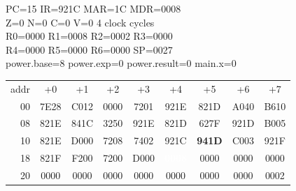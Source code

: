 \begin{tcolorbox}[stepbox, title={Step 5 \hfill PC 14 \quad ST R1, power.base}]
PC=15 IR=921C MAR=1C MDR=0008\\
Z=0 N=0 C=0 V=0 \hfill \textcolor{dim}{4 clock cycles}\\
R0=0000 R1=0008 R2=0002 R3=0000\\
R4=0000 R5=0000 R6=0000 SP=0027\\
\textcolor{dim}{power.base=8  power.exp=0  power.result=0  main.x=0}\\[1pt]
{\setlength{\tabcolsep}{1.6pt}\begin{tabular}{@{}r*{8}{c}@{}}
\textcolor{dim}{addr} & \textcolor{dim}{+0} & \textcolor{dim}{+1} & \textcolor{dim}{+2} & \textcolor{dim}{+3} & \textcolor{dim}{+4} & \textcolor{dim}{+5} & \textcolor{dim}{+6} & \textcolor{dim}{+7}\\
\textcolor{dim}{00} & 7E28 & C012 & 0000 & 7201 & 921E & 821D & A040 & B610\\
\textcolor{dim}{08} & 821E & 841C & 3250 & 921E & 821D & 627F & 921D & B005\\
\textcolor{dim}{10} & 821E & D000 & 7208 & 7402 & 921C & \cellcolor{pcc}\textbf{941D} & C003 & 921F\\
\textcolor{dim}{18} & 821F & F200 & 7200 & D000 & \cellcolor{wrt}\textcolor{white}{\textbf{0008}} & \cellcolor{datac}0000 & \cellcolor{datac}0000 & \cellcolor{datac}0000\\
\textcolor{dim}{20} & \cellcolor{stackc}0000 & \cellcolor{stackc}0000 & \cellcolor{stackc}0000 & \cellcolor{stackc}0000 & \cellcolor{stackc}0000 & \cellcolor{stackc}0000 & \cellcolor{stackc}0000 & \cellcolor{stackc}0002\\
\end{tabular}}
\end{tcolorbox}\par\vspace{3pt}
